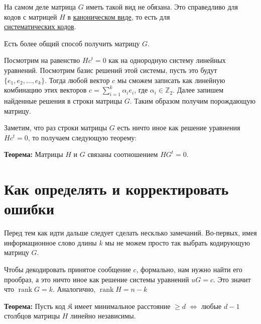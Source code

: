 \documentclass{article}
\newcommand{\THRM}[1] {
    \textbf{Теорема: } #1
}
\DeclareMathOperator{\rank}{rank}
\begin{document}
    На самом деле матрица $G$ иметь такой вид не обязана. Это справедливо для кодов с матрицей $H$ в \underline{ каноническом виде}, то есть для \\ 
    \underline{систематических кодов}.
    
    Есть более общий способ получить матрицу $G$. 

    Посмотрим на равенство $Hc^t = 0$ как на однородную систему линейных уравнений. Посмотрим базис решений этой системы, пусть это будут $\{e_1, e_2, \dots , e_k\}$.
    Тогда любой вектор $c$ мы сможем записать как линейную комбинацию этих векторов $c = \sum_{i = 1}^k \alpha_i e_i$, где $\alpha_i \in \mathbb{Z}_2$. Далее запишем
    найденные решения в строки матрицы $G$. Таким образом получим порождающую матрицу.

    Заметим, что раз строки матрицы $G$ есть ничто иное как решение уравнения $Hc^t = 0$, то получаем следующую теорему:

    \THRM{Матрицы $H$ и $G$ связаны соотношением $HG^t = 0$.}

    \section{Как определять и корректировать ошибки}

    Перед тем как идти дальше следует сделать несклько замечаний. Во-первых, имея информационное слово длины $k$ мы не можем просто так выбрать кодирующую матрицу $G$. 
    
    Чтобы декодировать принятое сообщение $c$, формально, нам нужно найти его прообраз, а это ничто иное как решение системы уравнений $uG = c$. 
    Это значит что $\rank G = k$. Аналогично, $\rank H = n - k$

    \THRM{Пусть код $\mathfrak{K}$ имеет минимальное расстояние $\ge d$ $\Leftrightarrow$ любые $d - 1$ столбцов матрицы $H$ линейно независимы.}
\end{document}
